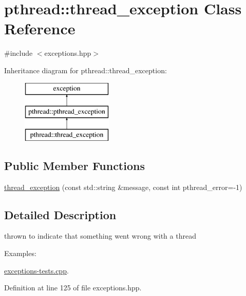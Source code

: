 \hypertarget{classpthread_1_1thread__exception}{\section{pthread\+:\+:thread\+\_\+exception Class Reference}
\label{classpthread_1_1thread__exception}
}


{\ttfamily \#include $<$exceptions.\+hpp$>$}

Inheritance diagram for pthread\+:\+:thread\+\_\+exception\+:\begin{figure}[H]
\begin{center}
\leavevmode
\includegraphics[height=3.000000cm]{classpthread_1_1thread__exception}
\end{center}
\end{figure}
\subsection*{Public Member Functions}
\begin{DoxyCompactItemize}
\item 
\hyperlink{classpthread_1_1thread__exception_acdaadcbdcd315d86a4466d1be460a7b7}{thread\+\_\+exception} (const std\+::string \&message, const int pthread\+\_\+error=-\/1)
\end{DoxyCompactItemize}


\subsection{Detailed Description}
thrown to indicate that something went wrong with a thread \begin{Desc}
\item[Examples\+: ]\par
\hyperlink{exceptions-tests_8cpp-example}{exceptions-\/tests.\+cpp}.\end{Desc}


Definition at line 125 of file exceptions.\+hpp.



